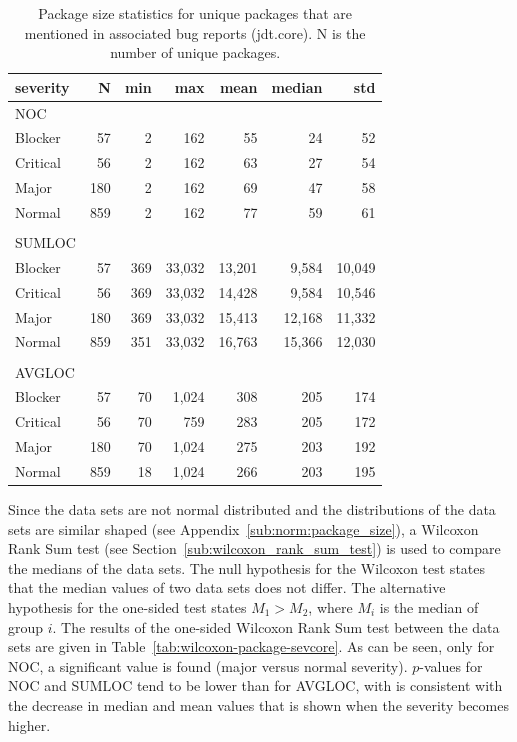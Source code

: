 \begin{table}[!ht]\footnotesize
	\centering
	\begin{tabular}{lrrrrrr}
		\toprule
		severity & N & min & max & mean & median & std \\
		\midrule
		NOC \\
		\midrule 
		Blocker & 57 & 2 & 162 & 55 & 24 & 52\\
		Critical & 56 & 2 & 162 & 63 & 27 & 54\\
		Major & 180 & 2 & 162 & 69 & 47 & 58\\
		Normal & 859 & 2 & 162 & 77 & 59 & 61\\\\
		\midrule
		SUMLOC \\
		\midrule
		Blocker & 57 & 369 & 33,032 & 13,201 & 9,584 & 10,049\\
		Critical & 56 & 369 & 33,032 & 14,428 & 9,584 & 10,546\\
		Major & 180 & 369 & 33,032 & 15,413 & 12,168 & 11,332\\
		Normal & 859 & 351 & 33,032 & 16,763 & 15,366 & 12,030\\\\
		\midrule
		AVGLOC \\
		\midrule
		Blocker & 57 & 70 & 1,024 & 308 & 205 & 174\\
		Critical & 56 & 70 & 759 & 283 & 205 & 172\\
		Major & 180 & 70 & 1,024 & 275 & 203 & 192\\
		Normal & 859 & 18 & 1,024 & 266 & 203 & 195\\
		\bottomrule
	\end{tabular} 
	\caption{Package size statistics for unique packages that are mentioned in associated bug reports (jdt.core). N is the number of unique packages.}
	\label{tab:package-sev-stats}
\end{table}

Since the data sets are not normal distributed and the distributions of the data sets are similar shaped (see Appendix~\ref{sub:norm:package_size}), a Wilcoxon Rank Sum test (see Section~\ref{sub:wilcoxon_rank_sum_test}) is used to compare the medians of the data sets. The null hypothesis for the Wilcoxon test states that the median values of two data sets does not differ. The alternative hypothesis for the one-sided test states $M_1 > M_2$, where $M_i$ is the median of group $i$. The results of the one-sided Wilcoxon Rank Sum test between the data sets are given in Table~\ref{tab:wilcoxon-package-sevcore}. As can be seen, only for NOC, a significant value is found (major versus normal severity). $p$-values for NOC and SUMLOC tend to be lower than for AVGLOC, with is consistent with the decrease in median and mean values that is shown when the severity becomes higher.


